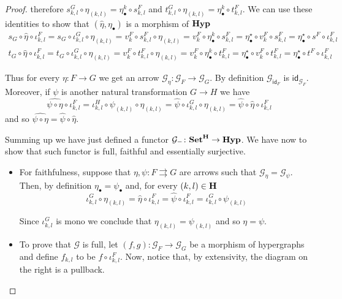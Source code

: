 \documentclass[3p]{elsarticle}
\newcommand{\catname}[1]{\textbf{\textup{#1}}}
\newcommand{\hyp}{\catname{Hyp}}
\newcommand{\id}[1]{\mathsf{id}_{#1}}
\theoremstyle{remark}
\theoremstyle{definition}
\begin{document}
\begin{proof}
	\smallskip \noindent 
	therefore  $s^G_{k,l}\circ \eta_{(k,l)} =  \eta^k_\bullet  \circ s^F_{k,l}$ and $t^G_{k,l}\circ \eta_{(k,l)} =  \eta^k_\bullet \circ t^F_{k,l}$. We can use these identities to show that $(\hat{\eta}, \eta_{\bullet})$ is a morphism of $\hyp$
	\begin{gather*}
		s_G\circ \hat{\eta} \circ \iota^F_{k,l}=s_G\circ \iota^G_{k,l}\circ \eta_{(k,l)}=v^F_k\circ s^F_{k,l}\circ \eta_{(k,l)} = v^F_k \circ \eta^k_\bullet  \circ s^F_{k,l} = \eta^\star_\bullet \circ v^F_k\circ s^{F}_{k,l} =\eta^\star_\bullet \circ s^F\circ \iota^F_{k,l}\\
		t_G\circ \hat{\eta} \circ \iota^F_{k,l}=t_G\circ \iota^G_{k,l}\circ \eta_{(k,l)}=v^F_k\circ t^F_{k,l}\circ \eta_{(k,l)} = v^F_k \circ \eta^k_\bullet  \circ t^F_{k,l} = \eta^\star_\bullet \circ v^F_k\circ t^{F}_{k,l} =\eta^\star_\bullet \circ t^F\circ \iota^F_{k,l}
	\end{gather*}
	
	Thus for every $\eta\colon F\to G$ we get an arrow $\mathcal{G}_{\eta}\colon \mathcal{G}_F\to \mathcal{G}_G$. By definition $\mathcal{G}_{\id{F}}$ is $\id{\mathcal{G}_F}$. Moreover, if $\psi$ is another natural transformation $G\to H$ we have 
	\[\widehat{\psi\circ \eta}\circ \iota^{F}_{k,l}=\iota^{H}_{k,l}\circ \psi_{(k,l)}\circ \eta_{(k,l)} = \hat{\psi}\circ \iota^G_{k,l}\circ \eta_{(k,l)} = \hat{\psi}\circ \hat{\eta}\circ \iota^{F}_{k,l}\]
	and so $\widehat{\psi\circ \eta}=\hat{\psi}\circ \hat{\eta}$.
	
	Summing up we have just defined a functor $\mathcal{G}_{-}\colon \catname{Set}^{\catname{H}}\to \hyp$. We have now to show that such functor is full, faithful and essentially surjective.
	\begin{itemize}
		\item For faithfulness, suppose that $\eta, \psi\colon F\rightrightarrows G$ are arrows such that $\mathcal{G}_\eta = \mathcal{G}_\psi$. Then, by definition $\eta_{\bullet}=\psi_{\bullet}$ and, for every $(k,l)\in \catname{H}$
		\[\iota^G_{k,l}\circ \eta_{(k,l)} = \hat{\eta}\circ \iota^F_{k,l}=\hat{\psi}\circ \iota^F_{k,l} = \iota^G_{k,l}\circ \psi_{(k,l)} \]
		
		Since $\iota^G_{k,l}$ is mono we conclude that $\eta_{(k,l)}=\psi_{(k,l)}$ and so $\eta = \psi$.
		\item To prove that $\mathcal{G}$ is full, let $(f,g)\colon \mathcal{G}_F\to \mathcal{G}_{G}$ be a morphism of hypergraphs and define $f_{k,l}$ to be $f\circ \iota^F_{k,l}$. Now, notice that, by extensivity, the diagram on the right is a pullback.
		

\end{itemize}
\end{proof}
\end{document}
